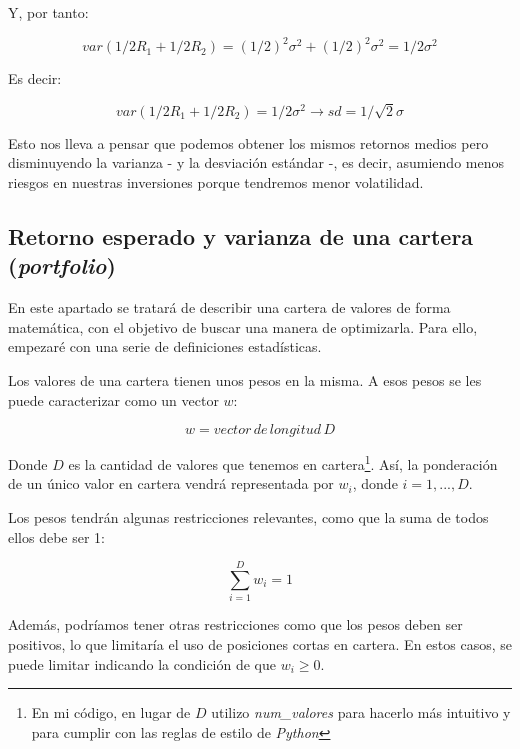 Y, por tanto:

\begin{equation}
	var(1/2R_{1} + 1/2R_{2}) = (1/2)^{2}\sigma^{2} + (1/2)^{2}\sigma^{2} = 1/2\sigma^{2}
\end{equation}

Es decir: 

\begin{equation}
	var(1/2R_{1} + 1/2R_{2}) = 1/2\sigma^{2} \rightarrow sd = 1/\sqrt{2}\sigma
\end{equation}


Esto nos lleva a pensar que podemos obtener los mismos retornos medios pero disminuyendo la varianza - y la desviación estándar -, es decir, asumiendo menos riesgos en nuestras inversiones porque tendremos menor volatilidad. 

\subsection{Retorno esperado y varianza de una cartera (\emph{portfolio})}

En este apartado se tratará de describir una cartera de valores de forma matemática, con el objetivo de buscar una manera de optimizarla. Para ello, empezaré con una serie de definiciones estadísticas.

Los valores de una cartera tienen unos pesos en la misma. A esos pesos se les puede caracterizar como un vector $w$:

\begin{equation*}
	w = vector\, de\, longitud\, D
\end{equation*}

Donde $D$ es la cantidad de valores que tenemos en cartera\footnote{En mi código, en lugar de $D$ utilizo \textit{num\_valores} para hacerlo más intuitivo y para cumplir con las reglas de estilo de \textit{Python}}. Así, la ponderación de un único valor en cartera vendrá representada por $w_{i}$, donde $i = 1,...,D$.

Los pesos tendrán algunas restricciones relevantes, como que la suma de todos ellos debe ser 1:

\begin{equation}
	\sum_{i=1}^{D}w_{i} = 1
\end{equation}

Además, podríamos tener otras restricciones como que los pesos deben ser positivos, lo que limitaría el uso de posiciones cortas \citep{wiki:posicion_corta} en cartera. En estos casos, se puede limitar indicando la condición de que $w_{i} \geq 0$. 

